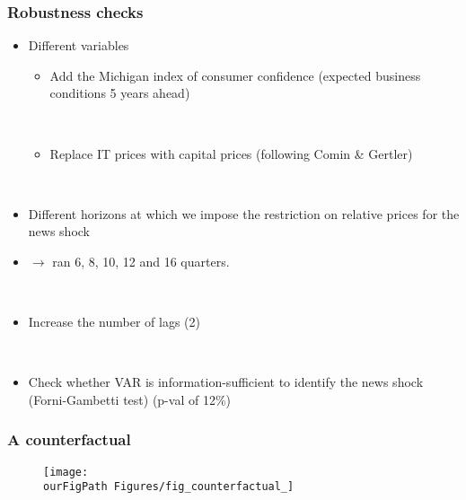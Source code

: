 \documentclass{beamer}
\def \ourFigPath {../../}
\begin{document}
\begin{frame}
	\frametitle{Robustness checks}

\begin{itemize}
\item Different variables
	\begin{itemize}
	\item Add the Michigan index of consumer confidence (expected business conditions 5 years ahead)
	
	
	\
	
	\item Replace IT prices with capital prices (following Comin \& Gertler)
	\end{itemize}
	
	\
	
\item Different horizons at which we impose the restriction on relative prices for the news shock
\item[] $\rightarrow$ ran  6, 8, 10, 12 and 16 quarters.

\

\item Increase the number of lags (2)

\

\item Check whether VAR is information-sufficient to identify the news shock (Forni-Gambetti test) (p-val of 12\%)
\end{itemize}
   		 	
\end{frame}

\begin{frame}
	\frametitle{A counterfactual} 

	\begin{figure}
		\centering
		\texttt{[image: \\ourFigPath Figures/fig\_counterfactual\_]}
	\end{figure}

	

   		 	
\end{frame}
\end{document}
